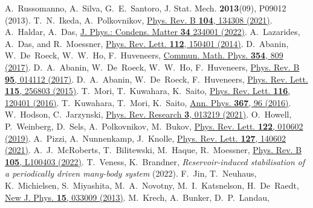 \documentclass[aps,pre,twocolumn,notitlepage,floats,10pt]{revtex4-1}
\begin{document}
\begin{references}
  A.~Russomanno, A.~Silva, G.~E.~Santoro, J. Stat. Mech. {\bf 2013}(09), P09012 (2013).
  T.~N.~Ikeda, A.~Polkovnikov,
  \href{https://doi.org/10.1103/PhysRevB.104.134308}{Phys. Rev. B {\bf 104}, 134308 (2021)}.
  A.~Haldar, A.~Das, 
  \href{https://doi.org/10.1088/1361-648X/ac03d2}{J. Phys.: Condens. Matter {\bf 34} 234001 (2022)}.
  A.~Lazarides, A.~Das, and R.~Moessner,
  \href{https://doi.org/10.1103/PhysRevLett.112.150401}{Phys. Rev. Lett. {\bf 112}, 150401 (2014)}.
  D.~Abanin, W.~De~Roeck, W.~W.~Ho, F.~Huveneers,
  \href{https://doi.org/10.1007/s00220-017-2930-x}{Commun.  Math. Phys. {\bf 354}, 809 (2017)}.
  D.~A.~Abanin, W.~De~Roeck, W.~W.~Ho, F.~Huveneers,
  \href{https://doi.org/10.1103/PhysRevB.95.014112}{Phys. Rev. B {\bf 95}, 014112 (2017)}.
  D.~A.~Abanin, W.~De~Roeck, F.~Huveneers,
  \href{https://doi.org/10.1103/PhysRevLett.115.256803}{Phys. Rev. Lett. {\bf 115}, 256803 (2015)}.
  T.~Mori, T.~Kuwahara, K.~Saito,
  \href{https://doi.org/10.1103/PhysRevLett.116.120401}{Phys. Rev. Lett. {\bf 116}, 120401 (2016)}.
  T.~Kuwahara, T.~Mori, K.~Saito,
  \href{https://doi.org/10.1016/j.aop.2016.01.012}{Ann. Phys. {\bf 367}, 96 (2016)}.
  W.~Hodson, C.~Jarzynski,
  \href{https://doi.org/10.1103/PhysRevResearch.3.013219}{Phys. Rev. Research {\bf 3}, 013219 (2021)}.
  O.~Howell, P.~Weinberg, D.~Sels, A.~Polkovnikov, M.~Bukov,
  \href{https://doi.org/10.1103/PhysRevLett.122.010602}{Phys. Rev. Lett. {\bf 122}, 010602 (2019)}.
  A.~Pizzi, A.~Nunnenkamp, J.~Knolle,
  \href{https://doi.org/10.1103/PhysRevLett.127.140602}{Phys. Rev. Lett. {\bf 127}, 140602 (2021)}.
  A.~J.~McRoberts, T.~Bilitewski, M.~Haque, R.~Moessner, 
  \href{https://doi.org/10.1103/PhysRevB.105.L100403}{Phys. Rev. B {\bf 105}, L100403 (2022)}.
  T.~Veness, K.~Brandner, \emph{Reservoir-induced stabilisation of a periodically driven many-body system} (2022).
  F.~Jin, T.~Neuhaus, K.~Michielsen, S.~Miyashita, M.~A.~Novotny,
  M.~I.~Katsnelson, H.~De~Raedt,
  \href{http://dx.doi.org/10.1088/1367-2630/15/3/033009}{New J. Phys. {\bf 15}, 033009 (2013)}.
  M.~Krech, A.~Bunker, D.~P.~Landau,

\end{references}
\end{document}

